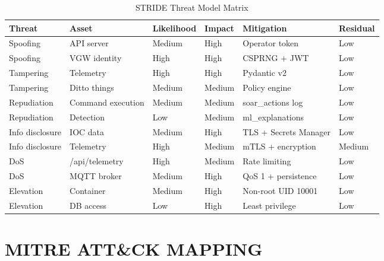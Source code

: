 \documentclass[12pt,a4paper]{amritareport}
\begin{document}
\begin{table}[H]
\centering
\caption{STRIDE Threat Model Matrix}
\label{tab:stride}
\small
\begin{tabular}{@{}P{1.9cm}P{2.3cm}P{1.8cm}P{1.6cm}P{3.1cm}P{1.5cm}@{}}
\toprule
\textbf{Threat} & \textbf{Asset} & \textbf{Likelihood} & \textbf{Impact} & \textbf{Mitigation} & \textbf{Residual} \\
\midrule
Spoofing & API server & Medium & High & Operator token & Low \\
Spoofing & VGW identity & High & High & CSPRNG + JWT & Low \\
Tampering & Telemetry & High & High & Pydantic v2 & Low \\
Tampering & Ditto things & Medium & Medium & Policy engine & Low \\
Repudiation & Command execution & Medium & Medium & soar\_actions log & Low \\
Repudiation & Detection & Low & Medium & ml\_explanations & Low \\
Info disclosure & IOC data & Medium & High & TLS + Secrets Manager & Low \\
Info disclosure & Telemetry & High & Medium & mTLS + encryption & Medium \\
DoS & /api/telemetry & High & Medium & Rate limiting & Low \\
DoS & MQTT broker & Medium & High & QoS 1 + persistence & Low \\
Elevation & Container & Medium & High & Non-root UID 10001 & Low \\
Elevation & DB access & Low & High & Least privilege & Low \\
\bottomrule
\end{tabular}
\end{table}

\section{MITRE ATT\&CK MAPPING}
\end{document}
